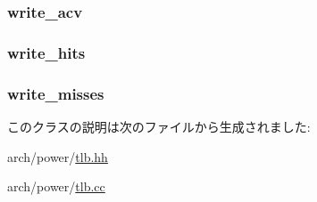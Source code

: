 \label{classPowerISA_1_1TLB_af3301e9dd0bb91de161b7bafefade7f3}
\hypertarget{classPowerISA_1_1TLB_a764f5ef97bfcb1ba3ad05704de5a3a32}{
\subsubsection[{write\_\-acv}]{ {\bf write\_\-acv}}}
\label{classPowerISA_1_1TLB_a764f5ef97bfcb1ba3ad05704de5a3a32}
\hypertarget{classPowerISA_1_1TLB_ab3172bfd014e75dcad1b0a2a91de59dd}{
\subsubsection[{write\_\-hits}]{ {\bf write\_\-hits}}}
\label{classPowerISA_1_1TLB_ab3172bfd014e75dcad1b0a2a91de59dd}
\hypertarget{classPowerISA_1_1TLB_af8519a07f8f1f76c8fff9c9a1aaa4638}{
\subsubsection[{write\_\-misses}]{ {\bf write\_\-misses}}}
\label{classPowerISA_1_1TLB_af8519a07f8f1f76c8fff9c9a1aaa4638}


このクラスの説明は次のファイルから生成されました:\begin{DoxyCompactItemize}
\item 
arch/power/\hyperlink{arch_2power_2tlb_8hh}{tlb.hh}\item 
arch/power/\hyperlink{arch_2power_2tlb_8cc}{tlb.cc}\end{DoxyCompactItemize}

